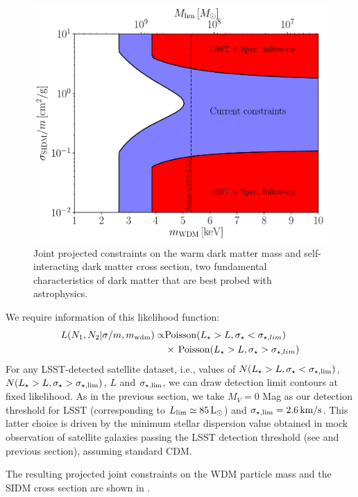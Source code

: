 \begin{figure}
\centering
\includegraphics[width=0.6\columnwidth]{figures/SIDM_WDM_figw_coll.pdf}
\caption{\label{fig:sidm_wdm} Joint projected constraints on the warm dark matter mass and self-interacting dark matter cross section, two fundamental characteristics of dark matter that are best probed with astrophysics. }
\end{figure}

We require information of this likelihood function:
\begin{eqnarray}
L(N_1,N_2|\sigma/m,m_{\rm wdm}) \propto & {\rm Poisson}(L_\star>L, \sigma_\star < \sigma_{\star,lim}) \\
& \times\, {\rm Poisson}(L_\star>L, \sigma_\star> \sigma_{\star,lim})
\end{eqnarray}
For any LSST-detected satellite dataset, i.e., values of $N(L_\star>L, \sigma_\star < \sigma_{\star,\rm lim})$, $N(L_\star>L,\sigma_\star> \sigma_{\star,\rm lim})$, $L$ and $\sigma_{\star,\rm lim}$, we can draw detection limit contours at fixed likelihood. As in the previous section,
we take $M_V=0$ Mag as our detection threshold for LSST (corresponding to $L_{\rm lim}\simeq 85 \,{\rm L}_\odot$) and $\sigma_{\star,\rm lim}=2.6\, {\rm km}/{\rm s}$. This latter choice is driven by the minimum stellar dispersion value obtained in mock observation of satellite galaxies passing the LSST detection threshold (see \cite{Nadler:2018} and previous section), assuming standard CDM. 

The resulting projected joint constraints on the WDM particle mass and the SIDM cross section are shown in .

